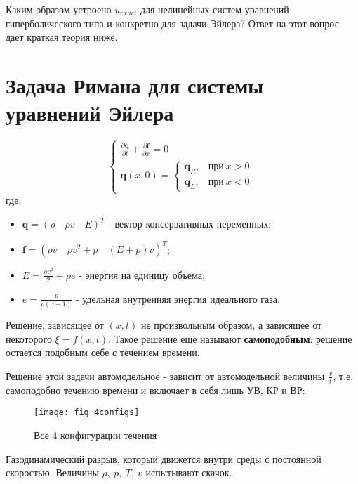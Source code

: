 Каким образом устроено $u_{exact}$ для нелинейных систем уравнений гиперболического типа и конкретно для задачи Эйлера? Ответ на этот вопрос дает краткая теория ниже.

\section{Задача Римана для системы уравнений Эйлера}\label{sect_EulerRiemann}

\begin{equation}
	\begin{cases}
		\frac{\partial \pmb{q}}{\partial t} + \frac{\partial \pmb{f}}{\partial x} = 0\\
		\pmb{q}(x, 0) =
		\begin{cases}
			\pmb{q}_R,&\text{при}\ x>0\\
			\pmb{q}_L,&\text{при}\ x<0
		\end{cases}
	\end{cases}
\end{equation}
где:
\begin{itemize}
	\item $\pmb{q} = (\rho\quad \rho v\quad E)^T$ - вектор консервативных переменных;
	\item $\pmb{f} = (\rho v\quad \rho v^2 + p\quad (E+p)v)^T$;
	\item $E = \frac{\rho v^2}{2} + \rho e$ - энергия на единицу объема;
	\item $e = \frac{p}{\rho(\gamma - 1)}$ - удельная внутренняя энергия идеального газа.
\end{itemize}

\begin{definition}
	Решение, зависящее от $(x, t)$ не произвольным образом, а зависящее от некоторого $\xi = f(x,t)$. Такое решение еще называют \textbf{самоподобным}: решение остается подобным себе с течением времени.
\end{definition}

Решение этой задачи автомодельное - зависит от автомодельной величины $\frac{x}{t}$, т.е. самоподобно течению времени и включает в себя лишь УВ, КР и ВР:

\begin{figure}[H]
	\centering
	
	\texttt{[image: fig\_4configs]}
	\caption{Все 4 конфигурации течения}
	\label{fig_4configs}
\end{figure}

\begin{definition}
	Газодинамический разрыв, который движется внутри среды с постоянной скоростью. Величины $\rho,\ p,\ T,\ v$ испытывают скачок.
\end{definition}

